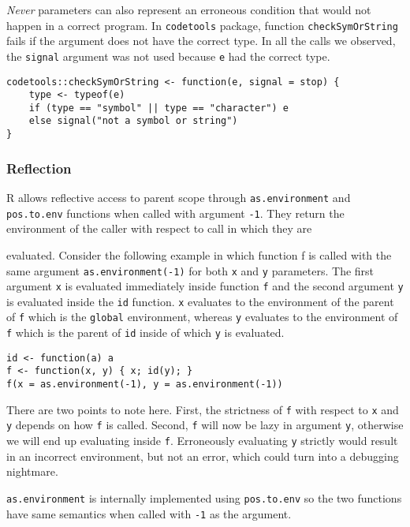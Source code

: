 \documentclass[screen,acmsmall]{acmart}
\newcommand{\never}{\emph{Never}\xspace}
\newcommand{\code}[1]{\lstinline[style=R]|#1|\xspace}
\begin{document}
\never parameters can also represent an erroneous condition that would not
happen in a correct program. In \code{codetools} package, function
\code{checkSymOrString} fails if the argument does not have the correct type. In
all the calls we observed, the \code{signal} argument was not used because
\code{e} had the correct type.
\begin{lstlisting}
codetools::checkSymOrString <- function(e, signal = stop) {
    type <- typeof(e)
    if (type == "symbol" || type == "character") e
    else signal("not a symbol or string")
}
\end{lstlisting}

\subsubsection{Reflection}

R allows reflective access to parent scope through \code{as.environment} and
\code{pos.to.env} functions when called with argument \code{-1}.
They return the environment of the caller with respect to call in which they are

evaluated. Consider the following example in which function f is called with the
same argument \code{as.environment(-1)} for both \code{x} and \code{y}
parameters. The first argument \code{x} is evaluated immediately inside
function \code{f} and the second argument \code{y} is evaluated inside the
\code{id} function. \code{x} evaluates to the environment of the parent of
\code{f} which is the \code{global} environment, whereas \code{y} evaluates to
the environment of \code{f} which is the parent of \code{id} inside of which
\code{y} is evaluated.

\begin{lstlisting}
id <- function(a) a
f <- function(x, y) { x; id(y); }
f(x = as.environment(-1), y = as.environment(-1))
\end{lstlisting}

There are two points to note here. First, the strictness of \code{f} with
respect to \code{x} and \code{y} depends on how \code{f} is called. Second,
\code{f} will now be lazy in argument \code{y}, otherwise we will end up
evaluating inside \code{f}. Erroneously evaluating \code{y} strictly would
result in an incorrect environment, but not an error, which could turn into a
debugging nightmare.

\code{as.environment} is internally implemented using \code{pos.to.env} so the
two functions have same semantics when called with \code{-1} as the argument.
\end{document}
